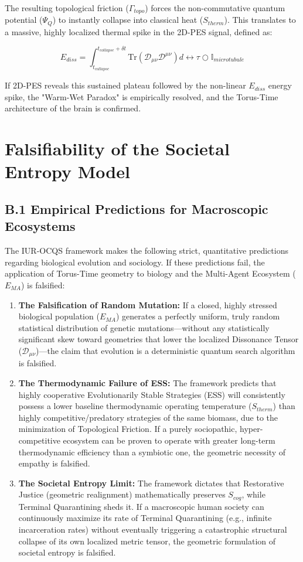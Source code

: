 \documentclass[12pt,openany]{book}
\begin{document}
The resulting topological friction ($\Gamma_{topo}$) forces the non-commutative quantum potential ($\Psi_Q$) to instantly collapse into classical heat ($S_{therm}$). This translates to a massive, highly localized thermal spike in the 2D-PES signal, defined as:

\begin{equation}
E_{diss} = \int_{t_{collapse}}^{t_{collapse} + \delta t} \text{Tr}(\mathcal{D}_{\mu\nu} \mathcal{D}^{\mu\nu}) d\leftrightarrow\tau \bigcirc \mathbb{I}_{microtubule}
\end{equation}

If 2D-PES reveals this sustained plateau followed by the non-linear $E_{diss}$ energy spike, the "Warm-Wet Paradox" is empirically resolved, and the Torus-Time architecture of the brain is confirmed.

\chapter{Falsifiability of the Societal Entropy Model}

\section{B.1 Empirical Predictions for Macroscopic Ecosystems}
The IUR-OCQS framework makes the following strict, quantitative predictions regarding biological evolution and sociology. If these predictions fail, the application of Torus-Time geometry to biology and the Multi-Agent Ecosystem ($E_{MA}$) is falsified:

\begin{enumerate}
    \item \textbf{The Falsification of Random Mutation:} If a closed, highly stressed biological population ($E_{MA}$) generates a perfectly uniform, truly random statistical distribution of genetic mutations—without any statistically significant skew toward geometries that lower the localized Dissonance Tensor ($\mathcal{D}_{\mu\nu}$)—the claim that evolution is a deterministic quantum search algorithm is falsified.
    \item \textbf{The Thermodynamic Failure of ESS:} The framework predicts that highly cooperative Evolutionarily Stable Strategies (ESS) will consistently possess a lower baseline thermodynamic operating temperature ($S_{therm}$) than highly competitive/predatory strategies of the same biomass, due to the minimization of Topological Friction. If a purely sociopathic, hyper-competitive ecosystem can be proven to operate with greater long-term thermodynamic efficiency than a symbiotic one, the geometric necessity of empathy is falsified.
    \item \textbf{The Societal Entropy Limit:} The framework dictates that Restorative Justice (geometric realignment) mathematically preserves $S_{cog}$, while Terminal Quarantining sheds it. If a macroscopic human society can continuously maximize its rate of Terminal Quarantining (e.g., infinite incarceration rates) without eventually triggering a catastrophic structural collapse of its own localized metric tensor, the geometric formulation of societal entropy is falsified.
\end{enumerate}
\end{document}
